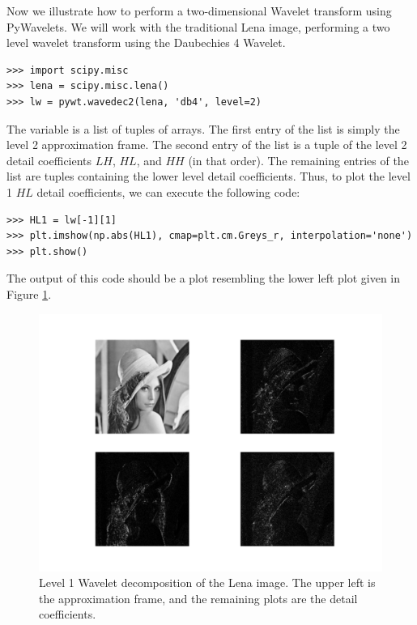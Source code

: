 Now we illustrate how to perform a two-dimensional Wavelet transform using
PyWavelets. We will work with the traditional Lena image, performing a
two level wavelet transform using the Daubechies 4 Wavelet.
\begin{lstlisting}
>>> import scipy.misc
>>> lena = scipy.misc.lena()
>>> lw = pywt.wavedec2(lena, 'db4', level=2)
\end{lstlisting}
The variable  is a list of tuples of arrays. The first entry of the list is
simply the level 2 approximation frame. The second entry of the list is a tuple of 
the level 2 detail coefficients $LH$, $HL$, and $HH$ (in that order). The remaining
entries of the list are tuples containing the lower level detail coefficients. 
Thus, to plot the level 1 $HL$ detail coefficients, we can execute the following code:
\begin{lstlisting}
>>> HL1 = lw[-1][1]
>>> plt.imshow(np.abs(HL1), cmap=plt.cm.Greys_r, interpolation='none')
>>> plt.show()
\end{lstlisting}
The output of this code should be a plot resembling the lower left plot given in Figure
\ref{fig:dwt2}.

\begin{figure}[t]
    \includegraphics[width=\linewidth]{dwt2.pdf}
    \caption{Level 1 Wavelet decomposition of the Lena image.
    The upper left is the approximation frame, and the remaining
    plots are the detail coefficients.}
    \label{fig:dwt2}
\end{figure}
 
